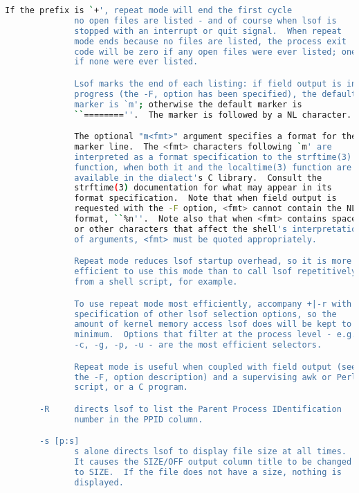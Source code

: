 {{\begin{lstlisting}[language=bash]
              If the prefix is `+', repeat mode will end the first cycle
              no open files are listed - and of course when lsof is
              stopped with an interrupt or quit signal.  When repeat
              mode ends because no files are listed, the process exit
              code will be zero if any open files were ever listed; one,
              if none were ever listed.

              Lsof marks the end of each listing: if field output is in
              progress (the -F, option has been specified), the default
              marker is `m'; otherwise the default marker is
              ``========''.  The marker is followed by a NL character.

              The optional "m<fmt>" argument specifies a format for the
              marker line.  The <fmt> characters following `m' are
              interpreted as a format specification to the strftime(3)
              function, when both it and the localtime(3) function are
              available in the dialect's C library.  Consult the
              strftime(3) documentation for what may appear in its
              format specification.  Note that when field output is
              requested with the -F option, <fmt> cannot contain the NL
              format, ``%n''.  Note also that when <fmt> contains spaces
              or other characters that affect the shell's interpretation
              of arguments, <fmt> must be quoted appropriately.

              Repeat mode reduces lsof startup overhead, so it is more
              efficient to use this mode than to call lsof repetitively
              from a shell script, for example.

              To use repeat mode most efficiently, accompany +|-r with
              specification of other lsof selection options, so the
              amount of kernel memory access lsof does will be kept to a
              minimum.  Options that filter at the process level - e.g.,
              -c, -g, -p, -u - are the most efficient selectors.

              Repeat mode is useful when coupled with field output (see
              the -F, option description) and a supervising awk or Perl
              script, or a C program.

       -R     directs lsof to list the Parent Process IDentification
              number in the PPID column.

       -s [p:s]
              s alone directs lsof to display file size at all times.
              It causes the SIZE/OFF output column title to be changed
              to SIZE.  If the file does not have a size, nothing is
              displayed.


\end{lstlisting}}}
